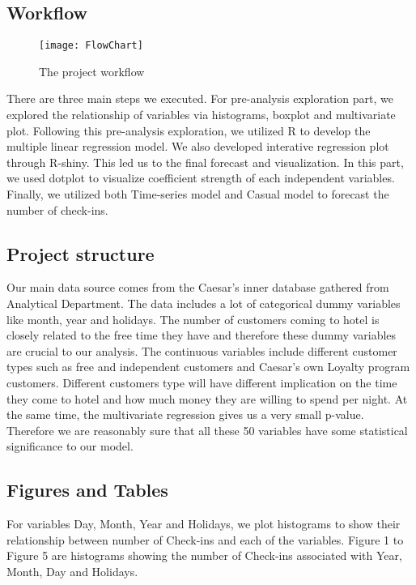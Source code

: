 \documentclass{article}
\begin{document}
\subsection{Workflow}

\begin{figure}[!htbp]
  \centering
    \texttt{[image: FlowChart]}
  \caption{The project workflow}

\end{figure}


There are three main steps we executed. For pre-analysis exploration part, we explored the relationship of variables via histograms, boxplot and multivariate plot. Following this pre-analysis exploration, we utilized R to develop the multiple linear regression model. We also developed interative regression plot through R-shiny. This led us to the final forecast and visualization. In this part, we used dotplot to visualize coefficient strength of each independent variables. Finally, we utilized both Time-series model and Casual model to forecast the number of check-ins.



\subsection{Project structure}

Our main data source comes from the Caesar's inner database gathered from Analytical Department. The data includes a lot of categorical dummy variables like month, year and holidays. The number of customers coming to hotel is closely related to the free time they have and therefore these dummy variables are crucial to our analysis. The continuous variables include different customer types such as free and independent customers and Caesar's own Loyalty program customers. Different customers type will have different implication on the time they come to hotel and how much money they are willing to spend per night. At the same time, the multivariate regression gives us a very small p-value. Therefore we are reasonably sure that all these 50 variables have some statistical significance to our model.


\subsection{Figures and Tables}
For variables Day, Month, Year and Holidays, we plot histograms to show their relationship between number of Check-ins and each of the variables. Figure 1 to Figure 5 are histograms showing the number of Check-ins associated with Year, Month, Day and Holidays. 
\end{document}

